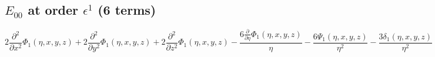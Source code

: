 
\subsection*{$E_{00}$ at order $\epsilon^1$ (6 terms)}
\begin{dmath}
2 \frac{\partial^{2}}{\partial x^{2}} \Phi_{1}{\left(\eta,x,y,z \right)} + 2 \frac{\partial^{2}}{\partial y^{2}} \Phi_{1}{\left(\eta,x,y,z \right)} + 2 \frac{\partial^{2}}{\partial z^{2}} \Phi_{1}{\left(\eta,x,y,z \right)} - \frac{6 \frac{\partial}{\partial \eta} \Phi_{1}{\left(\eta,x,y,z \right)}}{\eta} - \frac{6 \Psi_{1}{\left(\eta,x,y,z \right)}}{\eta^{2}} - \frac{3 \delta_{1}{\left(\eta,x,y,z \right)}}{\eta^{2}}
\end{dmath}


